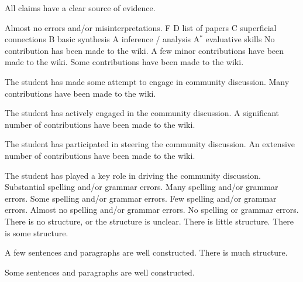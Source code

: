 \documentclass{../fal_assignment}
\begin{document}
\begin{markingrubric}
        \grade 		All claims have a clear source of evidence.
        \par 		Almost no errors and/or misinterpretations.
%
        \grade\fail F
        \grade		D list of papers
        \grade		C superficial connections
        \grade		B basic synthesis
        \grade		A inference / analysis
        \grade		A$^*$ evaluative skills 
%
        \grade\fail 	No contribution has been made to the wiki.
        \grade 		A few minor contributions have been made to the wiki.
        \grade 		Some contributions have been made to the wiki.
        \par		The student has made some attempt to engage in community discussion.
        \grade 		Many contributions have been made to the wiki.
        \par		{}
        \par		The student has actively engaged in the community discussion.
        \grade 		A significant number of contributions have been made to the wiki.
        \par		{}
        \par		The student has participated in steering the community discussion.
        \grade 		An extensive number of contributions have been made to the wiki.
        \par		{}
        \par		The student has played a key role in driving the community discussion.
%
        \grade\fail 	Substantial spelling and/or grammar errors.
        \grade 		Many spelling and/or grammar errors.
        \grade 		Some spelling and/or grammar errors.  
        \grade 		Few spelling and/or grammar errors.
        \grade 		Almost no spelling and/or grammar errors.
        \grade 		No spelling or grammar errors.
%
        \grade\fail 	There is no structure, or the structure is unclear.
        \grade 		There is little structure.
        \grade 		There is some structure.
        \par 		A few sentences and paragraphs are well constructed.
        \grade 		There is much structure.
        \par 		Some sentences and paragraphs are well constructed.

\end{markingrubric}
\end{document}
